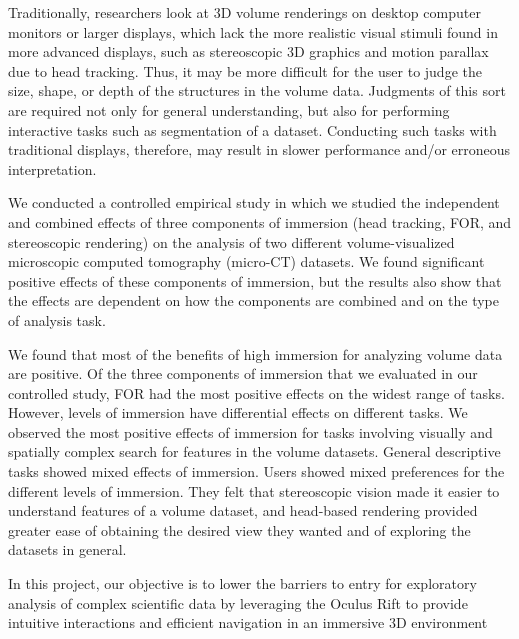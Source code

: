 


Traditionally, researchers look at 3D volume renderings on desktop computer monitors or larger displays, which lack the more realistic visual stimuli found in more advanced displays, such as stereoscopic 3D graphics and motion parallax due to head tracking. Thus, it may be more difficult for the user to judge the size, shape, or depth of the structures in the volume data. Judgments of this sort are required not only for general understanding, but also for performing interactive tasks such as segmentation of a dataset. Conducting such tasks with traditional displays, therefore, may result in slower performance and/or erroneous interpretation.
\cite{Laha2012}

We conducted a controlled empirical study in which we studied the independent and combined effects of three components of immersion (head tracking, FOR, and stereoscopic rendering) on the analysis of two different volume-visualized microscopic computed tomography (micro-CT) datasets. We found significant positive effects of these components of immersion, but the results also show that the effects are dependent on how the components are combined and on the type of analysis task.
\cite{Laha2012}

We found that most of the benefits of high immersion for analyzing volume data are positive. Of the three components of immersion that we evaluated in our controlled study, FOR had the most positive effects on the widest range of tasks. However, levels of immersion have differential effects on different tasks. We observed the most positive effects of immersion for tasks involving visually and spatially complex search for features in the volume datasets. General descriptive tasks showed mixed effects of immersion. Users showed mixed preferences for the different levels of immersion. They felt that stereoscopic vision made it easier to understand features of a volume dataset, and head-based rendering provided greater ease of obtaining the desired view they wanted and of exploring the datasets in general.
\cite{Laha2012}


In this project, our objective is to lower the barriers to entry for exploratory analysis of complex scientific data by leveraging the Oculus Rift to provide intuitive interactions and efficient navigation in an immersive 3D environment
\cite{Drouhard2015}

